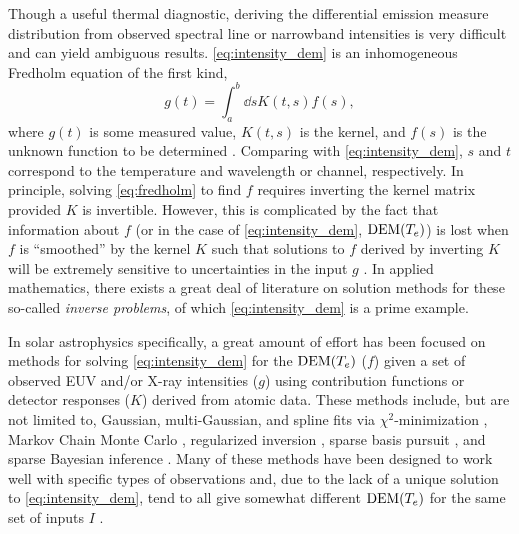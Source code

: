 Though a useful thermal diagnostic, deriving the differential emission measure distribution from observed spectral line or narrowband intensities is very difficult and can yield ambiguous results. \autoref{eq:intensity_dem} is an inhomogeneous Fredholm equation of the first kind,
\begin{equation}\label{eq:fredholm}
    g(t) = \int_a^b\dd{s}K(t,s)f(s),
\end{equation}
where $g(t)$ is some measured value, $K(t,s)$ is the kernel, and $f(s)$ is the unknown function to be determined \citep{press_numerical_1992}. Comparing with \autoref{eq:intensity_dem}, $s$ and $t$ correspond to the temperature and wavelength or channel, respectively. In principle, solving \autoref{eq:fredholm} to find $f$ requires inverting the kernel matrix provided $K$ is invertible. However, this is complicated by the fact that information about $f$ (or in the case of \autoref{eq:intensity_dem}, $\textup{DEM}(T_e)$) is lost when $f$ is ``smoothed'' by the kernel $K$ such that solutions to $f$ derived by inverting $K$ will be extremely sensitive to uncertainties in the input $g$ \citep{press_numerical_1992}. In applied mathematics, there exists a great deal of literature on solution methods for these so-called \textit{inverse problems}, of which \autoref{eq:intensity_dem} is a prime example.

In solar astrophysics specifically, a great amount of effort has been focused on methods for solving \autoref{eq:intensity_dem} for the $\textup{DEM}(T_e)$ ($f$) given a set of observed EUV and/or X-ray intensities ($g$) using contribution functions or detector responses ($K$) derived from atomic data. These methods include, but are not limited to, Gaussian, multi-Gaussian, and spline fits via $\chi^2$-minimization \citep[e.g.][]{guennou_accuracy_2012,warren_observations_2013,ryan_compatibility_2014,caspi_constraining_2014}, Markov Chain Monte Carlo \citep[MCMC,][]{kashyap_markov-chain_1998}, regularized inversion \citep{hannah_differential_2012,plowman_fast_2013}, sparse basis pursuit \citep{cheung_thermal_2015}, and sparse Bayesian inference \citep{warren_sparse_2017}. Many of these methods have been designed to work well with specific types of observations and, due to the lack of a unique solution to \autoref{eq:intensity_dem}, tend to all give somewhat different $\textup{DEM}(T_e)$ for the same set of inputs $I$ \citep[see comparison of 15 different methods by][]{aschwanden_benchmark_2015}.

